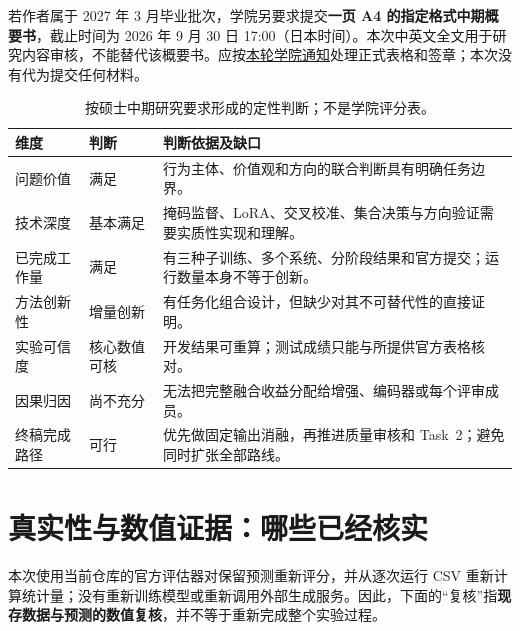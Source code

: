 \documentclass[12pt,a4paper]{article}
\begin{document}
若作者属于 2027 年 3 月毕业批次，学院另要求提交\textbf{一页 A4 的指定格式中期概要书}，截止时间为 2026 年 9 月 30 日 17:00（日本时间）。本次中英文全文用于研究内容审核，不能替代该概要书。应按\href{https://www.waseda.jp/fsci/gips/other/2026/07/09/35430/}{本轮学院通知}处理正式表格和签章；本次没有代为提交任何材料。

\begin{table}[htbp]
\centering\small
\caption{按硕士中期研究要求形成的定性判断；不是学院评分表。}
\begin{tabularx}{\textwidth}{@{}P{2.5cm}P{2.3cm}Y@{}}
\toprule
维度 & 判断 & 判断依据及缺口 \\
\midrule
问题价值 & 满足 & 行为主体、价值观和方向的联合判断具有明确任务边界。 \\
技术深度 & 基本满足 & 掩码监督、LoRA、交叉校准、集合决策与方向验证需要实质性实现和理解。 \\
已完成工作量 & 满足 & 有三种子训练、多个系统、分阶段结果和官方提交；运行数量本身不等于创新。 \\
方法创新性 & 增量创新 & 有任务化组合设计，但缺少对其不可替代性的直接证明。 \\
实验可信度 & 核心数值可核 & 开发结果可重算；测试成绩只能与所提供官方表格核对。 \\
因果归因 & 尚不充分 & 无法把完整融合收益分配给增强、编码器或每个评审成员。 \\
终稿完成路径 & 可行 & 优先做固定输出消融，再推进质量审核和 Task~2；避免同时扩张全部路线。 \\
\bottomrule
\end{tabularx}
\end{table}

\section{真实性与数值证据：哪些已经核实}
本次使用当前仓库的官方评估器对保留预测重新评分，并从逐次运行 CSV 重新计算统计量；没有重新训练模型或重新调用外部生成服务。因此，下面的“复核”指\textbf{现存数据与预测的数值复核}，并不等于重新完成整个实验过程。
\end{document}
